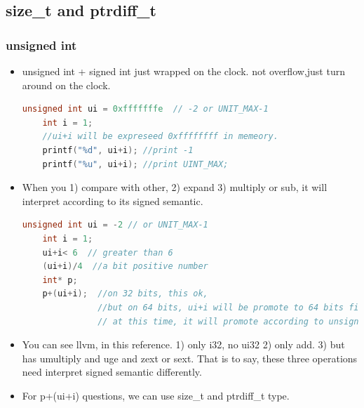 \documentclass[a4paper,12pt,twoside]{book}
\begin{document}
\subsection{size\_t and ptrdiff\_t}

\subsubsection{unsigned int}
\begin{itemize}
	\item unsigned int + signed int just wrapped on the clock. not overflow,just turn around on the clock. 
	
	\begin{lstlisting}[frame=single, language=c++]
    unsigned int ui = 0xfffffffe  // -2 or UNIT_MAX-1
    int i = 1;
    //ui+i will be expreseed 0xffffffff in memeory. 
    printf("%d", ui+i); //print -1
    printf("%u", ui+i); //print UINT_MAX;
	\end{lstlisting}
	
	\item When you 1) compare with other, 2) expand 3) multiply or sub, it will interpret according to its signed semantic. 
		\begin{lstlisting}[frame=single, language=c++]
	unsigned int ui = -2 // or UNIT_MAX-1
	int i = 1;
	ui+i< 6  // greater than 6
	(ui+i)/4  //a bit positive number
	int* p;
	p+(ui+i);  //on 32 bits, this ok, 
	           //but on 64 bits, ui+i will be promote to 64 bits first.
	           // at this time, it will promote according to unsigned int.
	\end{lstlisting}
	
	\item You can see llvm, in this reference. 1) only i32, no ui32 2) only add.  3) but has umultiply and uge and zext or sext. That is to say, these three operations need interpret signed semantic differently. 
	
	\item For p+(ui+i) questions, we can use size\_t and ptrdiff\_t type. 
\end{itemize}
\end{document}
